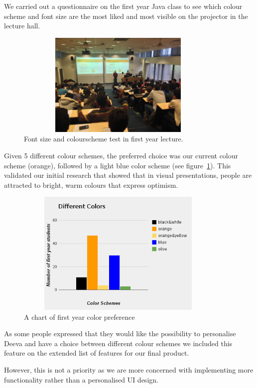 \documentclass[11pt, a4paper]{article}
\begin{document}
We carried out a questionnaire on the first year Java class to see which colour scheme and font size are the most liked and most visible on the projector in the lecture hall.

\begin{figure}[h!]
\centering
\includegraphics[height=50mm,width=100mm]{lectureHall.jpg}
\caption{Font size and colourscheme test in first year lecture.}
\end{figure}

Given 5 different colour schemes, the preferred choice was our current colour scheme (orange), followed by a light blue color scheme (see figure~\ref{fig:colours}).
This validated our initial research that showed that in visual presentations, people are attracted to bright, warm colours that express optimism.
\begin{figure}[h!]
\centering
\includegraphics[height=60mm,width=100mm]{colours.png}
\caption{A chart of first year color preference}
\label{fig:colours}
\end{figure}

As some people expressed that they would like the possibility to personalise Deeva and have a choice between different colour schemes we included this feature on the extended list of features for our final product.

However, this is not a priority as we are more concerned with implementing more functionality rather than a personalised UI design.
\end{document}

